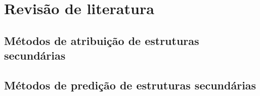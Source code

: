 
\chapter{Revisão de literatura}\label{ch:rev_literatura}


\section{Métodos de atribuição de estruturas secundárias}\label{section:metodos_atribuicao}






\section{Métodos de predição de estruturas secundárias}



